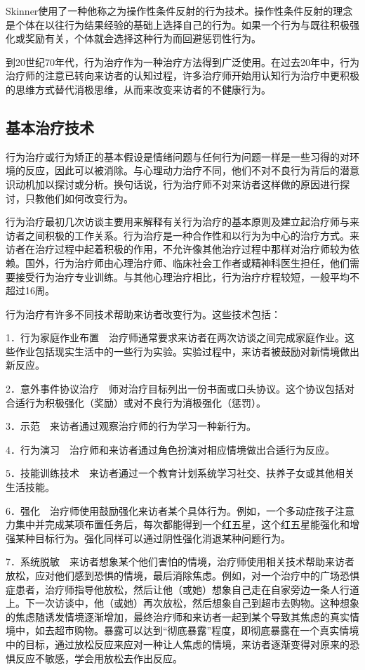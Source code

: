 Skinner使用了一种他称之为操作性条件反射的行为技术。操作性条件反射的理念是个体在以往行为结果经验的基础上选择自己的行为。如果一个行为与既往积极强化或奖励有关，个体就会选择这种行为而回避惩罚性行为。

到20世纪70年代，行为治疗作为一种治疗方法得到广泛使用。在过去20年中，行为治疗师的注意已转向来访者的认知过程，许多治疗师开始用认知行为治疗中更积极的思维方式替代消极思维，从而来改变来访者的不健康行为。

\subsection{基本治疗技术}

行为治疗或行为矫正的基本假设是情绪问题与任何行为问题一样是一些习得的对环境的反应，因此可以被消除。与心理动力治疗不同，他们不对不良行为背后的潜意识动机加以探讨或分析。换句话说，行为治疗师不对来访者这样做的原因进行探讨，只教他们如何改变行为。

行为治疗最初几次访谈主要用来解释有关行为治疗的基本原则及建立起治疗师与来访者之间积极的工作关系。行为治疗是一种合作性和以行为为中心的治疗方式。来访者在治疗过程中起着积极的作用，不允许像其他治疗过程中那样对治疗师较为依赖。国外，行为治疗师由心理治疗师、临床社会工作者或精神科医生担任，他们需要接受行为治疗专业训练。与其他心理治疗相比，行为治疗疗程较短，一般平均不超过16周。

行为治疗有许多不同技术帮助来访者改变行为。这些技术包括：

1．行为家庭作业布置　治疗师通常要求来访者在两次访谈之间完成家庭作业。这些作业包括现实生活中的一些行为实验。实验过程中，来访者被鼓励对新情境做出新反应。

2．意外事件协议治疗　师对治疗目标列出一份书面或口头协议。这个协议包括对合适行为积极强化（奖励）或对不良行为消极强化（惩罚）。

3．示范　来访者通过观察治疗师的行为学习一种新行为。

4．行为演习　治疗师和来访者通过角色扮演对相应情境做出合适行为反应。

5．技能训练技术　来访者通过一个教育计划系统学习社交、扶养子女或其他相关生活技能。

6．强化　治疗师使用鼓励强化来访者某个具体行为。例如，一个多动症孩子注意力集中并完成某项布置任务后，每次都能得到一个红五星，这个红五星能强化和增强某种目标行为。强化同样可以通过阴性强化消退某种问题行为。

7．系统脱敏　来访者想象某个他们害怕的情境，治疗师使用相关技术帮助来访者放松，应对他们感到恐惧的情境，最后消除焦虑。例如，对一个治疗中的广场恐惧症患者，治疗师指导他放松，然后让他（或她）想象自己走在自家旁边一条人行道上。下一次访谈中，他（或她）再次放松，然后想象自己到超市去购物。这种想象的焦虑随诱发情境逐渐增加，最终治疗师和来访者一起到某个导致其焦虑的真实情境中，如去超市购物。暴露可以达到“彻底暴露”程度，即彻底暴露在一个真实情境中的目标，通过放松反应来应对一种让人焦虑的情境，来访者逐渐变得对原来的恐惧反应不敏感，学会用放松去作出反应。

